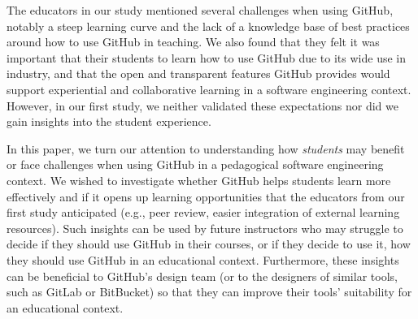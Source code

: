 The educators in our study mentioned several challenges when using GitHub, notably a steep learning curve and the lack of a knowledge base of best practices around how to use GitHub in teaching. We also found that they felt it was important that their students to learn how to use GitHub due to its wide use in industry, and that the open and transparent features GitHub provides would support experiential and collaborative learning in a software engineering context. However, in our first study, we neither validated these expectations nor did we gain insights into the student experience.

In this paper, we turn our attention to understanding how \emph{students} may benefit or face challenges when using GitHub in a pedagogical software engineering context. We wished to investigate whether GitHub helps students learn more effectively and if it opens up learning opportunities that the educators from our first study anticipated (e.g., peer review, easier integration of external learning resources). Such insights can be used by future instructors who may struggle to decide if they should use GitHub in their courses, or if they decide to use it, how they should use GitHub in an educational context. Furthermore, these insights can be beneficial to GitHub's design team (or to the designers of similar tools, such as GitLab or BitBucket) so that they can improve their tools' suitability for an educational context.




